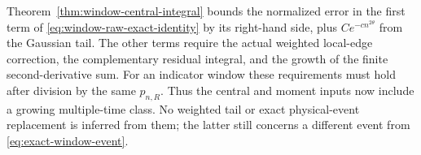 Theorem~\ref{thm:window-central-integral} bounds the normalized error
in the first term of \eqref{eq:window-raw-exact-identity} by its
right-hand side, plus $C e^{-c n^{2\theta}}$ from the Gaussian tail.
The other terms require the actual weighted local-edge correction,
the complementary residual integral, and the growth of the finite
second-derivative sum. For an indicator window these requirements
must hold after division by the same $p_{n,R}$.
Thus the central and moment inputs now include a growing multiple-time
class. No weighted tail or exact physical-event replacement is inferred
from them; the latter still concerns a different event from
\eqref{eq:exact-window-event}.
